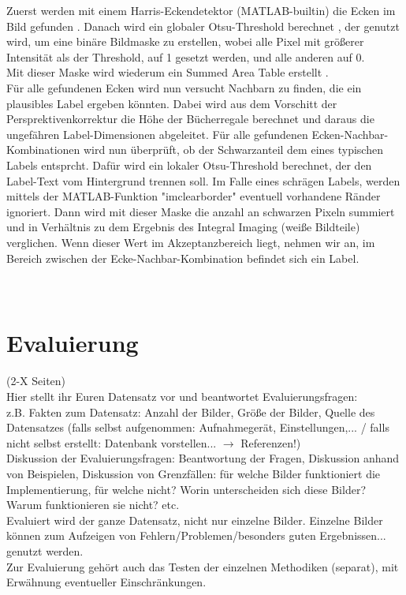 \documentclass[paper=A4, deutsch]{scrartcl}
\begin{document}
Zuerst werden mit einem Harris-Eckendetektor (MATLAB-builtin) die Ecken im Bild gefunden \cite{harris}. Danach wird ein globaler Otsu-Threshold berechnet \cite{otsu}, der genutzt wird, um eine binäre Bildmaske zu erstellen, wobei alle Pixel mit größerer Intensität als der Threshold, auf 1 gesetzt werden, und alle anderen auf 0.\\
Mit dieser Maske wird wiederum ein Summed Area Table erstellt \cite{integralimg}.\\
Für alle gefundenen Ecken wird nun versucht Nachbarn zu finden, die ein plausibles Label ergeben könnten. Dabei wird aus dem Vorschitt der Persprektivenkorrektur die Höhe der Bücherregale berechnet und daraus die ungefähren Label-Dimensionen abgeleitet. Für alle gefundenen Ecken-Nachbar-Kombinationen wird nun überprüft, ob der Schwarzanteil dem eines typischen Labels entsprcht. Dafür wird ein lokaler Otsu-Threshold berechnet, der den Label-Text vom Hintergrund trennen soll. Im Falle eines schrägen Labels, werden mittels der MATLAB-Funktion "imclearborder" eventuell vorhandene Ränder ignoriert. Dann wird mit dieser Maske die anzahl an schwarzen Pixeln summiert und in Verhältnis zu dem Ergebnis des Integral Imaging (weiße Bildteile) verglichen. Wenn dieser Wert im Akzeptanzbereich liegt, nehmen wir an, im Bereich zwischen der Ecke-Nachbar-Kombination befindet sich ein Label.\\
\\
\\

\section{Evaluierung}
(2-X Seiten)\\
Hier stellt ihr Euren Datensatz vor und beantwortet Evaluierungsfragen:\\
z.B. Fakten zum Datensatz: Anzahl der Bilder, Größe der Bilder, Quelle des Datensatzes (falls selbst aufgenommen: Aufnahmegerät, Einstellungen,... / falls nicht selbst erstellt: Datenbank vorstellen... $\to$ Referenzen!)\\
Diskussion der Evaluierungsfragen: Beantwortung der Fragen, Diskussion anhand von Beispielen, Diskussion von Grenzfällen: für welche Bilder funktioniert die Implementierung, für welche nicht? Worin unterscheiden sich diese Bilder? Warum funktionieren sie nicht? etc.\\
Evaluiert wird der ganze Datensatz, nicht nur einzelne Bilder. Einzelne Bilder können zum Aufzeigen von Fehlern/Problemen/besonders guten Ergebnissen... genutzt werden.\\
Zur Evaluierung gehört auch das Testen der einzelnen Methodiken (separat), mit Erwähnung eventueller Einschränkungen.
\end{document}
